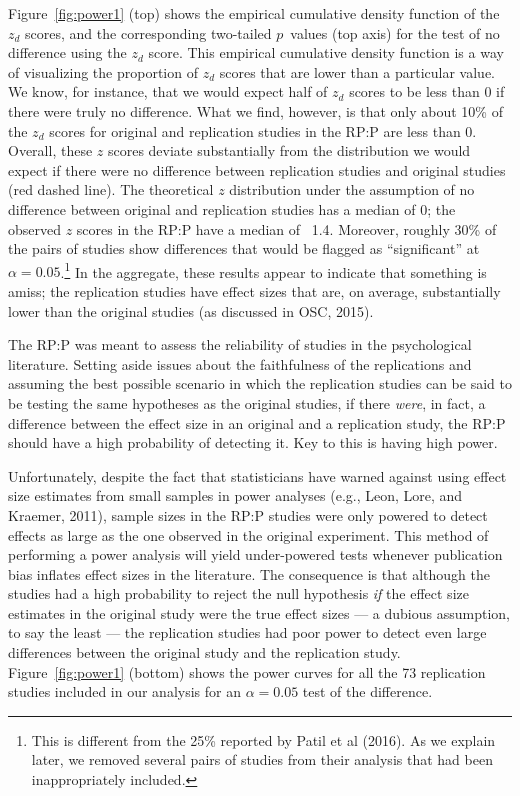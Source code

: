 \documentclass[doc,a4paper,floatsintext,draftfirst]{apa6}
\begin{document}
Figure~\ref{fig:power1} (top) shows the empirical cumulative density function of the $z_d$ scores, and the corresponding two-tailed $p$~values (top axis) for the test of no difference using the $z_d$ score. This empirical cumulative density function is a way of visualizing the proportion of $z_d$ scores that are lower than a particular value. We know, for instance, that we would expect half of $z_d$ scores to be less than 0 if there were truly no difference. What we find, however, is that only about 10\% of the $z_d$ scores for original and replication studies in the RP:P are less than 0. Overall, these $z$ scores deviate substantially from the distribution we would expect if there were no difference between replication studies and original studies (red dashed line). The theoretical $z$ distribution under the assumption of no difference between original and replication studies has a median of 0; the observed $z$ scores in the RP:P have a median of ~1.4. Moreover, roughly 30\% of the pairs of studies show differences that would be flagged as ``significant'' at $\alpha=0.05$.\footnote{This is different from the 25\% reported by Patil et al (2016). As we explain later, we removed several pairs of studies from their analysis that had been inappropriately included.} In the aggregate, these results appear to indicate that something is amiss; the replication studies have effect sizes that are, on average, substantially lower than the original studies (as discussed in OSC, 2015).


The RP:P was meant to assess the reliability of studies in the psychological literature. Setting aside issues about the faithfulness of the replications and assuming the best possible scenario in which the replication studies can be said to be testing the same hypotheses as the original studies, if there {\em were}, in fact, a difference between the effect size in an original and a replication study, the RP:P should have a high probability of detecting it. Key to this is having high power.

Unfortunately, despite the fact that statisticians have warned against using effect size estimates from small samples in power analyses (e.g., Leon, Lore, and Kraemer, 2011), sample sizes in the RP:P studies were only powered to detect effects as large as the one observed in the original experiment. This method of performing a power analysis will yield under-powered tests whenever publication bias inflates effect sizes in the literature. The consequence is that although the studies had a high probability to reject the null hypothesis {\em if} the effect size estimates in the original study were the true effect sizes --- a dubious assumption, to say the least --- the replication studies had poor power to detect even large differences between the original study and the replication study. Figure~\ref{fig:power1} (bottom) shows the power curves for all the 73 replication studies included in our analysis for an $\alpha=0.05$ test of the difference.
\end{document}
